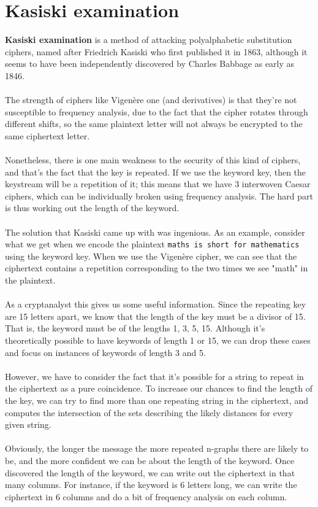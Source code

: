 \documentclass[Lau,binding=0.6cm,oneside]{sapthesis}
\begin{document}
\section{Kasiski examination}
\textbf{Kasiski examination} is a method of attacking polyalphabetic substitution ciphers, named after Friedrich Kasiski who first published it in 1863, although it seems to have been independently discovered by Charles Babbage as early as 1846.\\\\
The strength of ciphers like Vigenère one (and derivatives) is that they're not susceptible to frequency analysis, due to the fact that the cipher rotates through different shifts, so the same plaintext letter will not always be encrypted to the same ciphertext letter\supercite{kasiski}.\\\\
Nonetheless, there is one main weakness to the security of this kind of ciphers, and that's the fact that the key is repeated. If we use the keyword \textsf{key}, then the keystream will be a repetition of it; this means that we have 3 interwoven Caesar ciphers, which can be individually broken using frequency analysis. The hard part is thus working out the length of the keyword.\\\\
The solution that Kasiski came up with was ingenious. As an example, consider what we get when we encode the plaintext \colorbox{gray!12}{\small{\texttt{maths is short for mathematics}}} using the keyword \textsf{key}. When we use the Vigenère cipher, we can see that the ciphertext contains a repetition corresponding to the two times we see "math" in the plaintext.\\\\
As a cryptanalyst this gives us some useful information. Since the repeating key are 15 letters apart, we know that the length of the key must be a divisor of 15. That is, the keyword must be of the lengths 1, 3, 5, 15. Although it's theoretically possible to have keywords of length 1 or 15, we can drop these cases and focus on instances of keywords of length 3 and 5.\\\\
However, we have to consider the fact that it's possible for a string to repeat in the ciphertext as a pure coincidence. To increase our chances to find the length of the key, we can try to find more than one repeating string in the ciphertext, and computes the intersection of the sets describing the likely distances for every given string.\\\\
Obviously, the longer the message the more repeated n-graphs there are likely to be, and the more confident we can be about the length of the keyword. Once discovered the length of the keyword, we can write out the ciphertext in that many columns. For instance, if the keyword is 6 letters long, we can write the ciphertext in 6 columns and do a bit of frequency analysis on each column\supercite{kasiski_method}.\\\\
\end{document}
